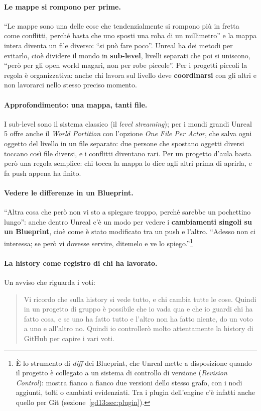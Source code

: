 \paragraph{Le mappe si rompono per prime.} ``Le mappe sono una delle cose che
tendenzialmente si rompono più in fretta come conflitti, perché basta che uno
sposti una roba di un millimetro'' e la mappa intera diventa un file diverso:
``si può fare poco''. Unreal ha dei metodi per evitarlo, cioè dividere il mondo
in \textbf{sub-level}, livelli separati che poi si uniscono, ``però per gli open
world magari, non per robe piccole''. Per i progetti piccoli la regola è
organizzativa: anche chi lavora sul livello deve \textbf{coordinarsi} con gli
altri e non lavorarci nello stesso preciso momento.

\paragraph{Approfondimento: una mappa, tanti file.} I sub-level sono il sistema
classico (il \emph{level streaming}); per i mondi grandi Unreal 5 offre anche
il \emph{World Partition} con l'opzione \emph{One File Per Actor}, che salva
ogni oggetto del livello in un file separato: due persone che spostano oggetti
diversi toccano così file diversi, e i conflitti diventano rari. Per un progetto
d'aula basta però una regola semplice: chi tocca la mappa lo dice agli altri
prima di aprirla, e fa push appena ha finito.

\paragraph{Vedere le differenze in un Blueprint.} ``Altra cosa che però non vi
sto a spiegare troppo, perché sarebbe un pochettino lungo'': anche dentro Unreal
c'è un modo per vedere i \textbf{cambiamenti singoli su un Blueprint}, cioè come
è stato modificato tra un push e l'altro. ``Adesso non ci interessa; se però vi
dovesse servire, ditemelo e ve lo spiego.''\footnote{È lo strumento di
\emph{diff} dei Blueprint, che Unreal mette a disposizione quando il progetto è
collegato a un sistema di controllo di versione (\emph{Revision Control}):
mostra fianco a fianco due versioni dello stesso grafo, con i nodi aggiunti,
tolti o cambiati evidenziati. Tra i plugin dell'engine c'è infatti anche quello
per Git (sezione~\ref{gd13:sec:plugin}).}

\paragraph{La history come registro di chi ha lavorato.} Un avviso che riguarda
i voti:
\begin{quote}
Vi ricordo che sulla history si vede tutto, e chi cambia tutte le cose. Quindi
in un progetto di gruppo è possibile che io vada qua e che io guardi chi ha
fatto cosa, e se uno ha fatto tutto e l'altro non ha fatto niente, do un voto a
uno e all'altro no. Quindi io controllerò molto attentamente la history di
GitHub per capire i vari voti.
\end{quote}

